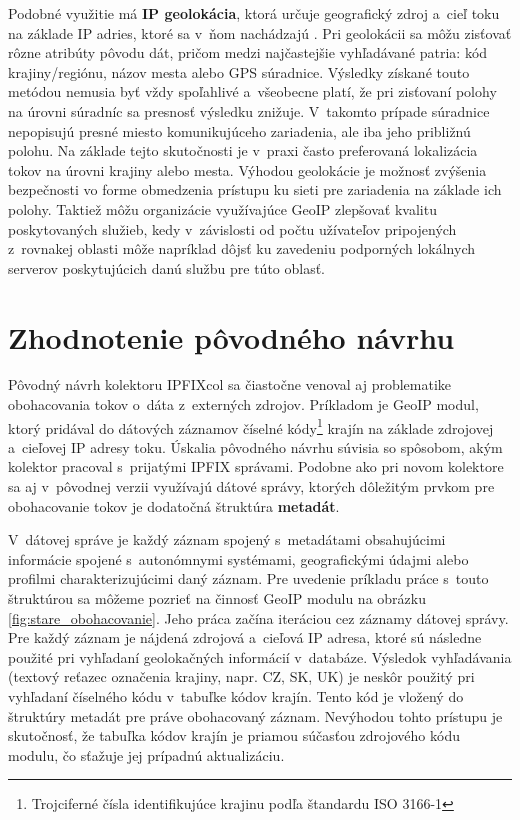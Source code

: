 Podobné využitie má \textbf{IP geolokácia}, ktorá určuje geografický zdroj a~cieľ toku na základe IP adries, ktoré sa v~ňom nachádzajú \cite{geoip}. Pri geolokácii sa môžu zisťovať rôzne atribúty pôvodu dát, pričom medzi najčastejšie
vyhľadávané patria: kód krajiny/regiónu, názov mesta alebo GPS súradnice. Výsledky získané touto metódou nemusia byť vždy spoľahlivé a~všeobecne platí, že pri zisťovaní polohy na úrovni súradníc sa presnosť výsledku znižuje.
V~takomto prípade súradnice nepopisujú presné miesto komunikujúceho zariadenia, ale iba jeho približnú polohu. Na základe tejto skutočnosti je v~praxi často preferovaná lokalizácia tokov na úrovni krajiny alebo mesta.
Výhodou geolokácie je možnosť zvýšenia bezpečnosti vo forme obmedzenia prístupu ku sieti pre zariadenia na základe ich polohy. Taktiež môžu organizácie využívajúce GeoIP zlepšovať kvalitu poskytovaných služieb, kedy v~závislosti od
počtu užívateľov pripojených z~rovnakej oblasti môže napríklad dôjsť ku zavedeniu podporných lokálnych serverov poskytujúcich danú službu pre túto oblasť.

\section{Zhodnotenie pôvodného návrhu}
\label{sec:zhodnotenie_navrhu}
Pôvodný návrh kolektoru IPFIXcol sa čiastočne venoval aj problematike obohacovania tokov o~dáta z~externých zdrojov. Príkladom je GeoIP modul, ktorý pridával do dátových záznamov číselné kódy\footnote{Trojciferné čísla identifikujúce
krajinu podľa štandardu ISO 3166-1} krajín na základe zdrojovej a~cieľovej IP adresy toku. Úskalia pôvodného návrhu súvisia so spôsobom, akým kolektor pracoval s~prijatými IPFIX správami. Podobne ako pri novom kolektore sa aj v~pôvodnej verzii
využívajú dátové správy, ktorých dôležitým prvkom pre obohacovanie tokov je dodatočná štruktúra \textbf{metadát}.


V~dátovej správe je každý záznam spojený s~metadátami obsahujúcimi informácie spojené s~autonómnymi systémami, geografickými údajmi alebo profilmi charakterizujúcimi daný záznam. Pre uvedenie príkladu práce s~touto štruktúrou sa môžeme pozrieť na činnosť GeoIP modulu na obrázku
\ref{fig:stare_obohacovanie}. Jeho práca začína iteráciou cez záznamy dátovej správy. Pre každý záznam je nájdená zdrojová a~cieľová IP adresa, ktoré sú následne použité pri vyhľadaní geolokačných informácií v~databáze. Výsledok vyhľadávania (textový reťazec označenia krajiny, napr. CZ, SK, UK) je
neskôr použitý pri vyhľadaní číselného kódu v~tabuľke kódov krajín. Tento kód je vložený do štruktúry metadát pre práve obohacovaný záznam. Nevýhodou tohto prístupu je skutočnosť, že tabuľka kódov krajín je priamou súčasťou zdrojového kódu modulu, čo sťažuje jej prípadnú aktualizáciu.

